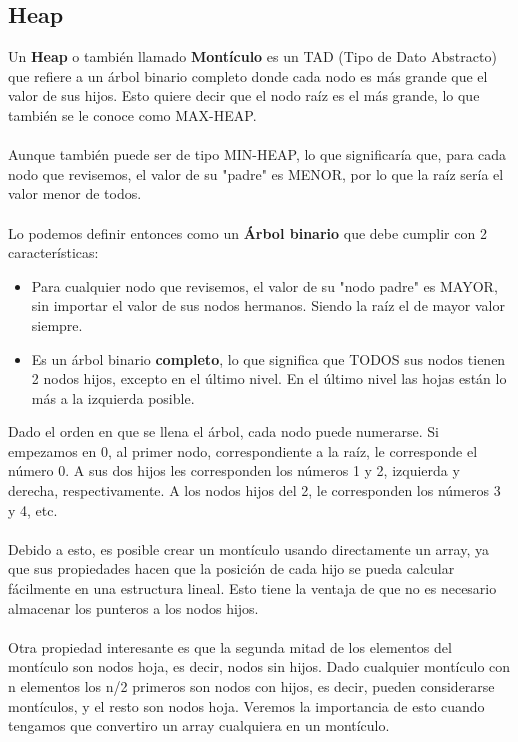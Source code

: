 \documentclass{report}
\begin{document}
\subsection{Heap}
Un \textbf{Heap} o también llamado \textbf{Montículo} es un TAD (Tipo de Dato Abstracto) que refiere a un árbol binario completo donde cada nodo es más grande que el valor de sus
hijos. Esto quiere decir que el nodo raíz es el más grande, lo que también se le conoce como MAX-HEAP. \\\\
Aunque también puede ser de tipo MIN-HEAP, lo que significaría que, para cada nodo que revisemos, el valor de su "padre" es MENOR, por lo que la raíz sería el valor menor de todos.\\\\
Lo podemos definir entonces como un \textbf{Árbol binario} que debe cumplir con 2 características:
\begin{itemize}
    \item Para cualquier nodo que revisemos, el valor de su "nodo padre" es MAYOR, sin importar el valor de sus nodos hermanos. Siendo la raíz el de mayor valor siempre.
    \item Es un árbol binario \textbf{completo}, lo que significa que TODOS sus nodos tienen 2 nodos hijos, excepto en el último nivel. En el último nivel las hojas están lo más a la izquierda posible.
\end{itemize}
Dado el orden en que se llena el árbol, cada nodo puede numerarse. Si empezamos en 0, al primer nodo, correspondiente a la raíz, le corresponde el número 0. A sus dos hijos les corresponden los números 1 y 2, izquierda y derecha, respectivamente. A los nodos hijos del 2, le corresponden los números 3 y 4, etc.\\\\
Debido a esto, es posible crear un montículo usando directamente un array, ya que sus propiedades hacen que la posición de cada hijo se pueda calcular fácilmente en una estructura lineal. Esto tiene la ventaja de que no es necesario almacenar los punteros a los nodos hijos.\\\\
Otra propiedad interesante es que la segunda mitad de los elementos del montículo son nodos hoja, es decir, nodos sin hijos. Dado cualquier montículo con n elementos los n/2 primeros son nodos con hijos, es decir, pueden considerarse montículos, y el resto son nodos hoja. Veremos la importancia de esto cuando tengamos que convertiro un array cualquiera en un montículo.\\\\
\end{document}
